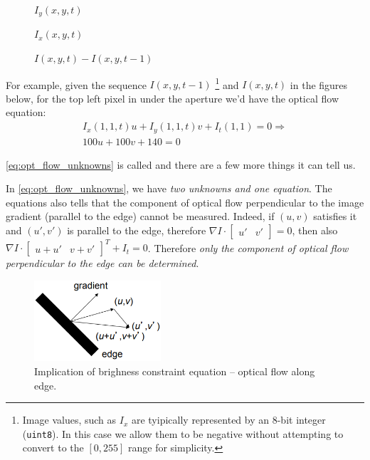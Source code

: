\documentclass[a4paper]{article}
\begin{document}
\begin{multicols}{3}
 
  \begin{figure}[H]
    \centering
    
    \caption{$I_y(x,y,t)$}
\end{figure}
 \columnbreak
 
  \begin{figure}[H]
    \centering
    
    \caption{$I_x(x,y,t)$}
\end{figure}
 \columnbreak
 
  \begin{figure}[H]
    \centering
    
    \caption{$I(x,y,t) - I(x,y,t-1)$}
\end{figure}
\end{multicols}
For example, given the sequence $I(x,y,t-1)$ \footnote{Image values, such as $I_x$ are tyipically represented by an 8-bit integer (\texttt{uint8}). In this case we allow them to be negative without attempting to convert to the $[0,255]$ range for simplicity.} and $I(x,y,t)$ in the figures below, for the top left pixel in under the aperture we'd have the optical flow equation:
\begin{gather*}
I_x(1,1,t)u + I_y(1,1,t)v + I_t(1,1)= 0 \Rightarrow \\
100u + 100v + 140 = 0
\end{gather*}

\eqref{eq:opt_flow_unknowns} is called  and there are a few more things it can tell us.

In \eqref{eq:opt_flow_unknowns}, we have \textit{two unknowns and one equation}. The equations also tells that the component of optical flow perpendicular to the image gradient (parallel to the edge) cannot be measured. Indeed, if $(u,v)$ satisfies it and $(u\prime,v\prime)$ is parallel to the edge, therefore $\nabla I \cdot \begin{bmatrix}u\prime & v\prime \end{bmatrix} = 0$, then also $\nabla I \cdot \begin{bmatrix}u+u\prime & v+v\prime \end{bmatrix}^T + I_t = 0$. Therefore \textit{only the component of optical flow perpendicular to the edge can be determined}.
\begin{multicols}{2}
 \columnbreak
\end{multicols}
\begin{figure}[H]
    \centering
    \includegraphics[height=3.0cm]{img/opt_flow/opt_flow_edge.PNG}
    \caption{Implication of brighness constraint equation -- optical flow along edge.}
\end{figure}
\end{document}
